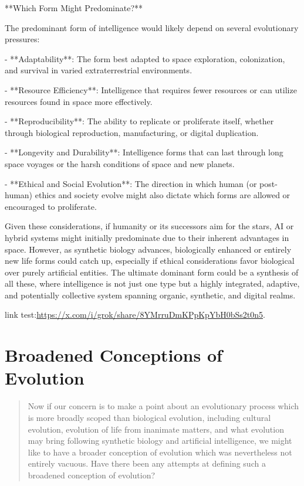 \documentclass[10pt,titlepage]{book}
\begin{document}
**Which Form Might Predominate?**

The predominant form of intelligence would likely depend on several evolutionary pressures:

- **Adaptability**: The form best adapted to space exploration, colonization, and survival in varied extraterrestrial environments.

- **Resource Efficiency**: Intelligence that requires fewer resources or can utilize resources found in space more effectively.

- **Reproducibility**: The ability to replicate or proliferate itself, whether through biological reproduction, manufacturing, or digital duplication.

- **Longevity and Durability**: Intelligence forms that can last through long space voyages or the harsh conditions of space and new planets.

- **Ethical and Social Evolution**: The direction in which human (or post-human) ethics and society evolve might also dictate which forms are allowed or encouraged to proliferate. 

Given these considerations, if humanity or its successors aim for the stars, AI or hybrid systems might initially predominate due to their inherent advantages in space. However, as synthetic biology advances, biologically enhanced or entirely new life forms could catch up, especially if ethical considerations favor biological over purely artificial entities. The ultimate dominant form could be a synthesis of all these, where intelligence is not just one type but a highly integrated, adaptive, and potentially collective system spanning organic, synthetic, and digital realms.

link test:\url{https://x.com/i/grok/share/8YMrruDmKPpKpYbH0bSs2t0n5}.

\section{Broadened Conceptions of Evolution}

\begin{quotation}
Now if our concern is to make a point about an evolutionary process which is more broadly scoped than biological evolution, including cultural evolution, evolution of life from inanimate matters, and what evolution may bring following  synthetic biology and artificial intelligence, we might like to have a broader conception of evolution which was nevertheless not entirely vacuous.  Have there been any attempts at defining such a broadened conception of evolution?
\end{quotation}
\end{document}
